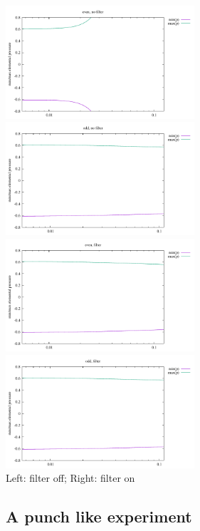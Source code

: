 \begin{center}
\includegraphics[width=7cm]{python_codes/fieldstone_12/results/rldc/rawp_even_nofilter}
\includegraphics[width=7cm]{python_codes/fieldstone_12/results/rldc/rawp_odd_nofilter}\\
\includegraphics[width=7cm]{python_codes/fieldstone_12/results/rldc/rawp_even_filter}
\includegraphics[width=7cm]{python_codes/fieldstone_12/results/rldc/rawp_odd_filter}\\
{\captionfont Left: filter off; Right: filter on}
\end{center}


\newpage
\subsection*{A punch like experiment}

